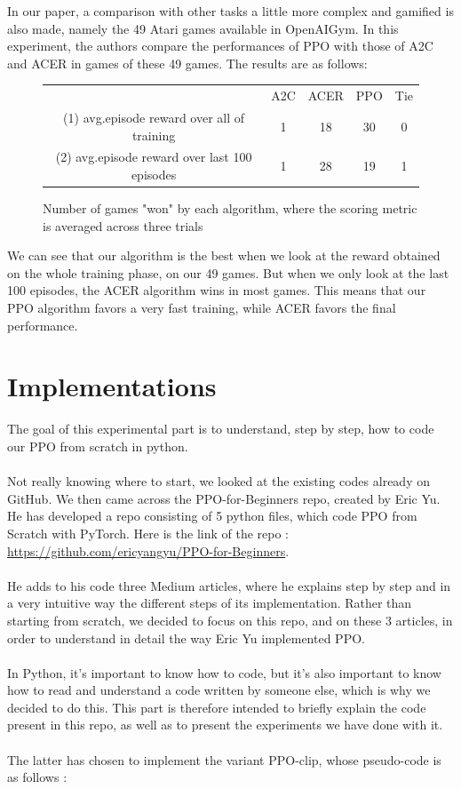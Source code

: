 \documentclass{article}
\begin{document}
In our paper, a comparison with other tasks a little more complex and gamified is also made, namely the 49 Atari games available in OpenAIGym. In this experiment, the authors compare the performances of PPO with those of A2C and ACER in games of these 49 games. The results are as follows:
\begin{figure}[!h]
    \centering
        \begin{tabular}{ c|c c c c } 
         \hline
         & A2C & ACER & PPO & Tie \\ 
         (1) avg.episode reward over all of training & 1 & 18 & 30 & 0 \\ 
         (2) avg.episode reward over last 100 episodes & 1 & 28 & 19 & 1 \\ 
         \hline
        \end{tabular}
    \caption{Number of games "won" by each algorithm, where the scoring metric is averaged across three trials}
\end{figure}


We can see that our algorithm is the best when we look at the reward obtained on the whole training phase, on our 49 games. But when we only look at the last 100 episodes, the ACER algorithm wins in most games. This means that our PPO algorithm favors a very fast training, while ACER favors the final performance.

\newpage 

\section{Implementations}


The goal of this experimental part is to understand, step by step, how to code our PPO from scratch in python. 
\\ \\
Not really knowing where to start, we looked at the existing codes already on GitHub. We then came across the PPO-for-Beginners repo, created by Eric Yu. He has developed a repo consisting of 5 python files, which code PPO from Scratch with PyTorch. Here is the link of the repo :  \url{https://github.com/ericyangyu/PPO-for-Beginners}.
\\ \\
He adds to his code three Medium articles, where he explains step by step and in a very intuitive way the different steps of its implementation. 
Rather than starting from scratch, we decided to focus on this repo, and on these 3 articles, in order to understand in detail the way Eric Yu implemented PPO. 
\\ \\
In Python, it's important to know how to code, but it's also important to know how to read and understand a code written by someone else, which is why we decided to do this. This part is therefore intended to briefly explain the code present in this repo, as well as to present the experiments we have done with it. 
\\ \\
The latter has chosen to implement the variant PPO-clip, whose pseudo-code is as follows :
\end{document}
